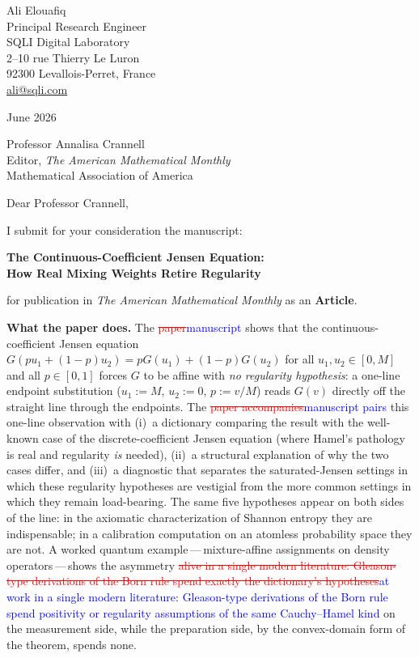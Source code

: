 \documentclass[12pt]{article}
\newcommand{\ReviewAdd}[1]{\textcolor{blue}{#1}}
\newcommand{\ReviewDel}[1]{\textcolor{red}{\sout{#1}}}
\begin{document}
\noindent
Ali Elouafiq\\
Principal Research Engineer\\
SQLI Digital Laboratory\\
2--10 rue Thierry Le Luron\\
92300 Levallois-Perret, France\\
\href{mailto:ali@sqli.com}{ali@sqli.com}

\bigskip
{} June 2026

\bigskip
\noindent
Professor Annalisa Crannell\\
Editor, \textit{The American Mathematical Monthly}\\
Mathematical Association of America

\bigskip
\noindent
Dear Professor Crannell,

\medskip
\noindent
I submit for your consideration the manuscript:

\begin{center}
  \textbf{The Continuous-Coefficient Jensen Equation:}\\
  \textbf{How Real Mixing Weights Retire Regularity}
\end{center}

\noindent
for publication in \textit{The American Mathematical Monthly} as an
\textbf{Article}.

\bigskip
\noindent\textbf{What the paper does.}
The \ReviewDel{paper}\ReviewAdd{manuscript} shows that the continuous-coefficient Jensen equation
$G(pu_1+(1-p)u_2)=pG(u_1)+(1-p)G(u_2)$ for all $u_1,u_2\in[0,M]$ and
all $p\in[0,1]$ forces $G$ to be affine with \emph{no regularity
hypothesis}: a one-line endpoint substitution ($u_1{:=}M$, $u_2{:=}0$,
$p{:=}v/M$) reads $G(v)$ directly off the straight line through the
endpoints. The \ReviewDel{paper accompanies}\ReviewAdd{manuscript pairs} this one-line observation with
(i)~a dictionary comparing the result with the well-known case of the
discrete-coefficient Jensen equation (where Hamel's pathology is real
and regularity \emph{is} needed), (ii)~a structural explanation of
why the two cases differ, and (iii)~a diagnostic that separates the
saturated-Jensen settings in which these regularity hypotheses are
vestigial from the more common settings in which they remain
load-bearing. The same five hypotheses appear on both sides of the
line: in the axiomatic characterization of Shannon entropy they are
indispensable; in a calibration computation on an atomless
probability space they are not. A worked quantum
example\,---\,mixture-affine assignments on density
operators\,---\,shows the asymmetry \ReviewDel{alive in a single modern
literature: Gleason-type derivations of the Born rule spend exactly
the dictionary's hypotheses}\ReviewAdd{at work in a single modern literature: Gleason-type derivations of the Born rule spend positivity or regularity assumptions of the same Cauchy--Hamel kind} on the measurement side, while the
preparation side, by the convex-domain form of the theorem, spends
none.
\end{document}
